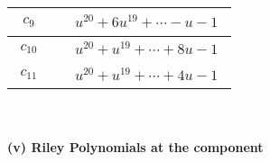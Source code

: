 \documentclass[1p]{elsarticle_modified}
\theoremstyle{definition}
\begin{document}
\begin{tabular}{m{50pt}|m{274pt}}
\hline $$\begin{aligned}c_{9}\end{aligned}$$&$\begin{aligned}
&u^{20}+6 u^{19}+\cdots- u-1
\end{aligned}$\\
\hline $$\begin{aligned}c_{10}\end{aligned}$$&$\begin{aligned}
&u^{20}+u^{19}+\cdots+8 u-1
\end{aligned}$\\
\hline $$\begin{aligned}c_{11}\end{aligned}$$&$\begin{aligned}
&u^{20}+u^{19}+\cdots+4 u-1
\end{aligned}$\\
\hline
\end{tabular}\\~\\
\newpage\renewcommand{\arraystretch}{1}
\flushleft \textbf{(v) Riley Polynomials at the component}\newline \\
\end{document}
